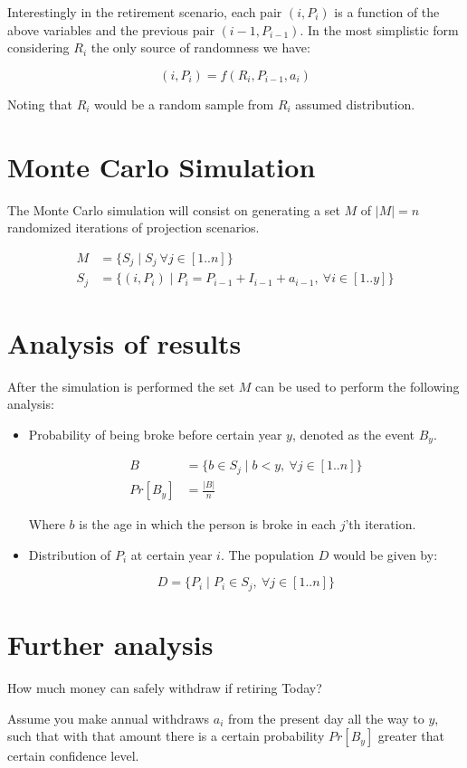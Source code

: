 \documentclass[10pt]{article}
\begin{document}
Interestingly in the retirement scenario, each pair $(i,P_i)$ is a function of the above variables and the previous pair $(i-1,P_{i-1})$.  In the most simplistic form considering \textbf{$R_i$} the only source of randomness we have:

\[ (i,P_i) = f(R_i, P_{i-1}, a_i) \]

Noting that $R_i$ would be a random sample from $R_i$ assumed distribution.

\section{Monte Carlo Simulation}

The Monte Carlo simulation will consist on generating a set $M$ of $|M|=n$ randomized iterations of projection scenarios.  

\begin{align*}
M & = \{ S_j \mid S_j ~ \forall j \in [1..n] \} \\
S_j & = \{(i,P_i) \mid  P_{i} = P_{i-1} + I_{i-1} + a_{i-1}, ~ \forall i \in [1..y] \}
\end{align*}

\section{Analysis of results}


After the simulation is performed the set $M$ can be used to perform the following analysis:

\begin{itemize}
\item Probability of being broke before certain year $y$, denoted as the event $B_y$.

\begin{align*}
B & = \{b \in S_j\mid b < y, ~ \forall j \in [1..n] \} \\
Pr[B_y] & = \frac{|B|}{n}
\end{align*}

Where $b$ is the age in which the person is broke in each $j$'th iteration.

\item Distribution of $P_i$ at certain year $i$.  The population $D$ would be given by:

\[D=\{P_i \mid P_i \in S_j, ~\forall j \in [1..n] \}\]

\end{itemize}

\section{Further analysis}

How much money can safely withdraw if retiring Today?

Assume you make annual withdraws $a_i$ from the present day all the way to $y$, such that with that amount there is a certain probability $Pr[B_y]$ greater that certain confidence level.
\end{document}
